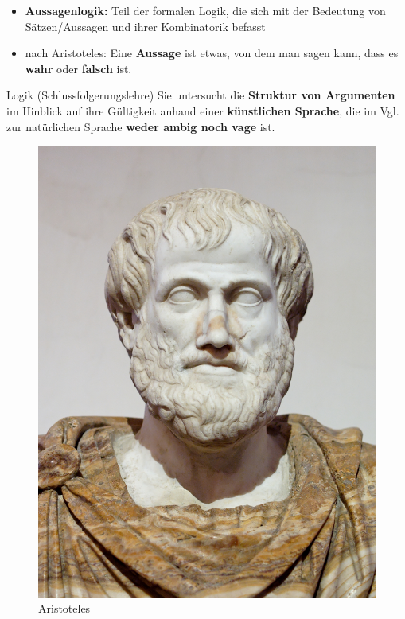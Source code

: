 \begin{frame}
\begin{minipage}{.67\textwidth}
	
	\begin{itemize}
		\item \textbf{Aussagenlogik:} Teil der formalen Logik, die sich mit der Bedeutung von Sätzen/Aussagen und ihrer Kombinatorik befasst
		\medskip
		\item nach Aristoteles: Eine \textbf{Aussage} ist etwas, von dem man sagen kann, dass es \textbf{wahr} oder \textbf{falsch} ist.
		
	\end{itemize}	
	
	\begin{block}{Logik (Schlussfolgerungslehre)}
		Sie untersucht die \textbf{Struktur von Argumenten} im Hinblick auf ihre Gültigkeit anhand einer \textbf{künstlichen Sprache}, die im Vgl. zur natürlichen Sprache \textbf{weder ambig noch vage} ist.
	\end{block}
	
\end{minipage}
\begin{minipage}{.30\textwidth}
	\begin{figure}
		\begin{center}
			\includegraphics[scale=.45]{material/Aristotle_Altemps}
		\end{center}	
		\caption{Aristoteles}
	\end{figure}
\end{minipage}

\end{frame}

